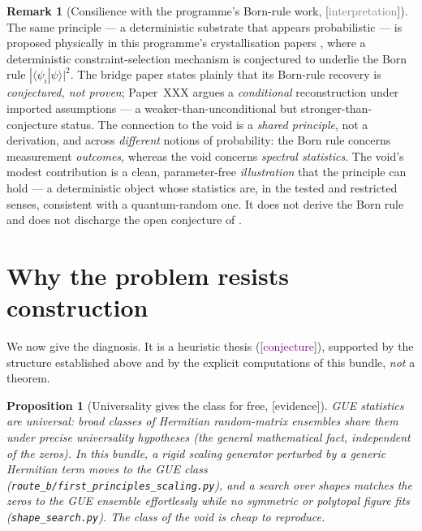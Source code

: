 \documentclass[11pt,a4paper]{article}
\newtheorem{proposition}[theorem]{Proposition}
\theoremstyle{definition}
\newtheorem{remark}[theorem]{Remark}
\newcommand{\TAGev}{{\small\textsf{[\textcolor{orange!80!black}{evidence}]}}}
\newcommand{\TAGconj}{{\small\textsf{[\textcolor{purple}{conjecture}]}}}
\newcommand{\TAGphil}{{\small\textsf{[\textcolor{gray}{interpretation}]}}}
\begin{document}
\begin{remark}[Consilience with the programme's Born-rule work, \TAGphil]
The same principle --- a deterministic substrate that appears probabilistic ---
is proposed physically in this programme's crystallisation papers
\cite{BridgePaper,ProbGeom}, where a deterministic constraint-selection
mechanism is conjectured to underlie the Born rule $|\langle\psi_i|\psi
\rangle|^2$. The bridge paper \cite{BridgePaper} states plainly that its
Born-rule recovery is \emph{conjectured, not proven}; Paper~XXX
\cite{ProbGeom} argues a \emph{conditional} reconstruction under imported
assumptions --- a weaker-than-unconditional but stronger-than-conjecture
status. The connection to the void is a \emph{shared principle}, not a
derivation, and across \emph{different} notions of probability: the Born rule
concerns measurement \emph{outcomes}, whereas the void concerns \emph{spectral
statistics}. The void's modest contribution is a clean, parameter-free
\emph{illustration} that the principle can hold --- a deterministic object
whose statistics are, in the tested and restricted senses, consistent with a
quantum-random one. It does not derive the Born rule and does not discharge
the open conjecture of \cite{BridgePaper}.
\end{remark}

\section{Why the problem resists construction}\label{sec:resist}

We now give the diagnosis. It is a heuristic thesis (\TAGconj), supported by
the structure established above and by the explicit computations of this
bundle, \emph{not} a theorem.

\begin{proposition}[Universality gives the class for free, \TAGev]\label{prop:universal}
GUE statistics are \emph{universal}: broad classes of Hermitian random-matrix
ensembles share them under precise universality hypotheses (the general
mathematical fact, independent of the zeros). In this bundle, a rigid scaling
generator perturbed by a \emph{generic} Hermitian term moves to the GUE class
(\texttt{route\_b/first\_principles\_scaling.py}), and a search over shapes
matches the zeros to the GUE \emph{ensemble} effortlessly while no symmetric or
polytopal figure fits (\texttt{shape\_search.py}). The \emph{class} of the void
is cheap to reproduce.
\end{proposition}
\end{document}
